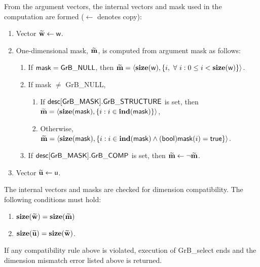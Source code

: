 From the argument vectors, the internal vectors and mask used in 
the computation are formed ($\leftarrow$ denotes copy):
\begin{enumerate}
    \item Vector ${\bf \widetilde{w}} \leftarrow {\sf w}$.

    \item One-dimensional mask, ${\bf \widetilde{m}}$, is computed from 
    argument {\sf mask} as follows:
    \begin{enumerate}
        \item If ${\sf mask} = {\sf GrB\_NULL}$, then ${\bf \widetilde{m}} = 
        \langle \bold{size}({\sf w}), \{i, \ \forall \ i : 0 \leq i < 
        \bold{size}({\sf w}) \} \rangle$.

        \item If {\sf mask} $\ne$ {\sf GrB\_NULL},  
        \begin{enumerate}
            \item If ${\sf desc[GrB\_MASK].GrB\_STRUCTURE}$ is set, then
            ${\bf \widetilde{m}} = 
            \langle \bold{size}({\sf mask}), \{i : i \in \bold{ind}({\sf mask}) \} \rangle$,
            \item Otherwise, ${\bf \widetilde{m}} = 
            \langle \bold{size}({\sf mask}), \{i : i \in \bold{ind}({\sf mask}) \wedge
            ({\sf bool}){\sf mask}(i) = {\sf true} \} \rangle$.
        \end{enumerate}

        \item    If ${\sf desc[GrB\_MASK].GrB\_COMP}$ is set, then 
        ${\bf \widetilde{m}} \leftarrow \neg {\bf \widetilde{m}}$.
    \end{enumerate}

    \item Vector ${\bf \widetilde{u}} \leftarrow {\sf u}$.
\end{enumerate}

The internal vectors and masks are checked for dimension compatibility. 
The following conditions must hold:
\begin{enumerate}
    \item $\bold{size}({\bf \widetilde{w}}) = \bold{size}({\bf \widetilde{m}})$
    \item $\bold{size}({\bf \widetilde{u}}) = \bold{size}({\bf \widetilde{w}})$.
\end{enumerate}
If any compatibility rule above is violated, execution of {\sf GrB\_select} ends and 
the dimension mismatch error listed above is returned.

